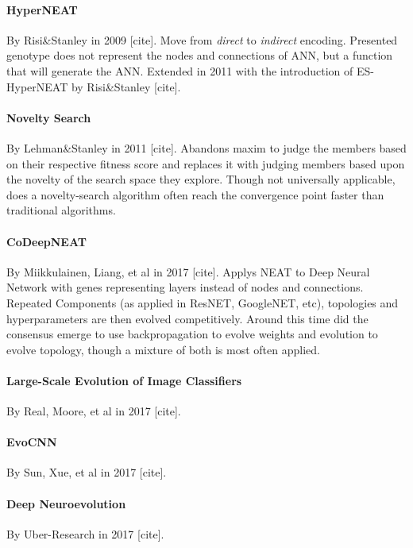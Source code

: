 \documentclass[journal, a4paper]{IEEEtran}
\begin{document}
\paragraph{HyperNEAT} By Risi\&Stanley in 2009 [cite]. Move from \textit{direct} to \textit{indirect} encoding. Presented genotype does not represent the nodes and connections of ANN, but a function that will generate the ANN. Extended in 2011 with the introduction of ES-HyperNEAT by Risi\&Stanley [cite].

\paragraph{Novelty Search} By Lehman\&Stanley in 2011 [cite]. Abandons maxim to judge the members based on their respective fitness score and replaces it with judging members based upon the novelty of the search space they explore. Though not universally applicable, does a novelty-search algorithm often reach the convergence point faster than traditional algorithms. 

\paragraph{CoDeepNEAT} By Miikkulainen, Liang, et al in 2017 [cite]. Applys NEAT to Deep Neural Network with genes representing layers instead of nodes and connections. Repeated Components (as applied in ResNET, GoogleNET, etc), topologies and hyperparameters are then evolved competitively. Around this time did the consensus emerge to use backpropagation to evolve weights and evolution to evolve topology, though a mixture of both is most often applied.

\paragraph{Large-Scale Evolution of Image Classifiers} By Real, Moore, et al in 2017 [cite].

\paragraph{EvoCNN} By Sun, Xue, et al in 2017 [cite].

\paragraph{Deep Neuroevolution} By Uber-Research in 2017 [cite].
\end{document}
